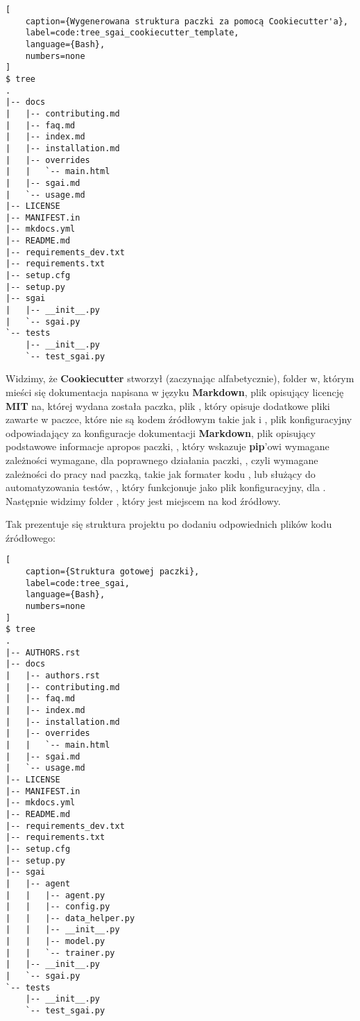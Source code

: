 \begin{onepage}
    \begin{lstlisting}[
    caption={Wygenerowana struktura paczki za pomocą Cookiecutter'a},
    label=code:tree_sgai_cookiecutter_template,
    language={Bash},
    numbers=none
]
$ tree
.
|-- docs
|   |-- contributing.md
|   |-- faq.md
|   |-- index.md
|   |-- installation.md
|   |-- overrides
|   |   `-- main.html
|   |-- sgai.md
|   `-- usage.md
|-- LICENSE
|-- MANIFEST.in
|-- mkdocs.yml
|-- README.md
|-- requirements_dev.txt
|-- requirements.txt
|-- setup.cfg
|-- setup.py
|-- sgai
|   |-- __init__.py
|   `-- sgai.py
`-- tests
    |-- __init__.py
    `-- test_sgai.py
    \end{lstlisting}
\end{onepage}


Widzimy, że \textbf{Cookiecutter} stworzył (zaczynając alfabetycznie), folder  w, którym mieści się dokumentacja napisana w języku \textbf{Markdown}, plik  opisujący licencję \textbf{MIT} na, której wydana została paczka, plik , który opisuje dodatkowe pliki zawarte w paczce, które nie są kodem źródłowym takie jak  i , plik konfiguracyjny  odpowiadający za konfiguracje dokumentacji \textbf{Markdown}, plik  opisujący podstawowe informacje apropos paczki, , który wskazuje \textbf{pip}'owi wymagane zależności wymagane, dla poprawnego działania paczki, , czyli wymagane zależności do pracy nad paczką, takie jak formater kodu , lub  służący do automatyzowania testów, , który funkcjonuje jako plik konfiguracyjny, dla .
Następnie widzimy folder , który jest miejscem na kod źródłowy.


\clearpage

Tak prezentuje się struktura projektu po dodaniu odpowiednich plików kodu źródłowego:

\begin{onepage}
    \begin{lstlisting}[
    caption={Struktura gotowej paczki},
    label=code:tree_sgai,
    language={Bash},
    numbers=none
]
$ tree
.
|-- AUTHORS.rst
|-- docs
|   |-- authors.rst
|   |-- contributing.md
|   |-- faq.md
|   |-- index.md
|   |-- installation.md
|   |-- overrides
|   |   `-- main.html
|   |-- sgai.md
|   `-- usage.md
|-- LICENSE
|-- MANIFEST.in
|-- mkdocs.yml
|-- README.md
|-- requirements_dev.txt
|-- requirements.txt
|-- setup.cfg
|-- setup.py
|-- sgai
|   |-- agent
|   |   |-- agent.py
|   |   |-- config.py
|   |   |-- data_helper.py
|   |   |-- __init__.py
|   |   |-- model.py
|   |   `-- trainer.py
|   |-- __init__.py
|   `-- sgai.py
`-- tests
    |-- __init__.py
    `-- test_sgai.py
    \end{lstlisting}
\end{onepage}


